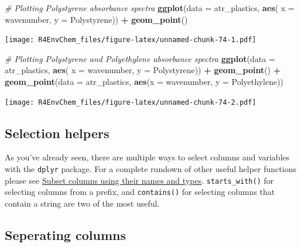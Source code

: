 \documentclass[
]{book}
\newenvironment{Shaded}{\begin{snugshade}}{\end{snugshade}}
\newcommand{\AttributeTok}[1]{\textcolor[rgb]{0.13,0.29,0.53}{#1}}
\newcommand{\CommentTok}[1]{\textcolor[rgb]{0.56,0.35,0.01}{\textit{#1}}}
\newcommand{\FunctionTok}[1]{\textcolor[rgb]{0.13,0.29,0.53}{\textbf{#1}}}
\newcommand{\NormalTok}[1]{#1}
\newcommand{\SpecialCharTok}[1]{\textcolor[rgb]{0.81,0.36,0.00}{\textbf{#1}}}
\begin{document}
\begin{Shaded}
\begin{Highlighting}[]
\CommentTok{\# Plotting Polystyrene absorbance spectra}
\FunctionTok{ggplot}\NormalTok{(}\AttributeTok{data =}\NormalTok{ atr\_plastics, }
       \FunctionTok{aes}\NormalTok{( }\AttributeTok{x =}\NormalTok{ wavenumber,}
            \AttributeTok{y =}\NormalTok{ Polystyrene)) }\SpecialCharTok{+}
  \FunctionTok{geom\_point}\NormalTok{()}
\end{Highlighting}
\end{Shaded}

\texttt{[image: R4EnvChem\_files/figure-latex/unnamed-chunk-74-1.pdf]}

\begin{Shaded}
\begin{Highlighting}[]
\CommentTok{\# Plotting Polystyrene and Polyethylene absorbance spectra}
\FunctionTok{ggplot}\NormalTok{(}\AttributeTok{data =}\NormalTok{ atr\_plastics, }
       \FunctionTok{aes}\NormalTok{( }\AttributeTok{x =}\NormalTok{ wavenumber,}
            \AttributeTok{y =}\NormalTok{ Polystyrene)) }\SpecialCharTok{+}
  \FunctionTok{geom\_point}\NormalTok{() }\SpecialCharTok{+}
  \FunctionTok{geom\_point}\NormalTok{(}\AttributeTok{data =}\NormalTok{ atr\_plastics, }
             \FunctionTok{aes}\NormalTok{(}\AttributeTok{x =}\NormalTok{ wavenumber, }
                 \AttributeTok{y =}\NormalTok{ Polyethylene))}
\end{Highlighting}
\end{Shaded}

\texttt{[image: R4EnvChem\_files/figure-latex/unnamed-chunk-74-2.pdf]}

\hypertarget{selection-helpers}{%
\subsection{Selection helpers}\label{selection-helpers}}

As you've already seen, there are multiple ways to select columns and variables with the \texttt{dplyr} package. For a complete rundown of other useful helper functions please see \href{https://dplyr.tidyverse.org/reference/select.html}{Subset columns using their names and types}. \texttt{starts\_with()} for selecting columns from a prefix, and \texttt{contains()} for selecting columns that contain a string are two of the most useful.

\hypertarget{seperating-columns}{%
\subsection{Seperating columns}\label{seperating-columns}}
\end{document}
